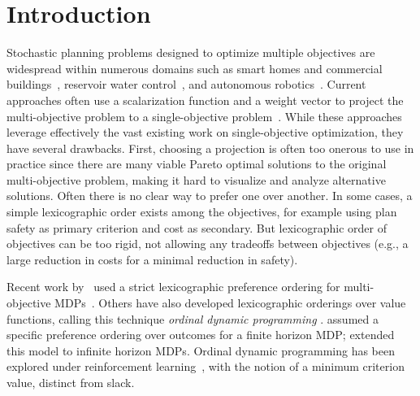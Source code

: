 \section{Introduction}
\label{sec:introduction}

Stochastic planning problems designed to optimize multiple objectives are widespread within numerous domains such as smart homes and commercial buildings~\cite{Kwak12-SAVES}, reservoir water control~\cite{Castelletti08-WaterReservoirControl}, and autonomous robotics~\cite{Mouaddib04-MultiObjectivePathPlanning,Calisi07-MultiObjectiveExplorationAndSearchRobots}. 
Current approaches often use a scalarization function and a weight vector to project the multi-objective problem to a single-objective problem~\cite{Roijers13-SurveyMultiObjective,Natarajan05-DynamicPreferencesMCRL,Perny10-FindingCompromiseSolutionsMOMDPs,Perny13-LorenzOptimalSolutionsMOMDPs}. While these approaches leverage effectively the vast existing work on single-objective optimization, they have several drawbacks.  First, choosing a projection is often too onerous to use in practice since there are many viable Pareto optimal solutions to the original multi-objective problem, making it hard to visualize and analyze alternative solutions. Often there is no clear way to prefer one over another. In some cases, a simple lexicographic order exists among the objectives, for example using plan safety as primary criterion and cost as secondary. But lexicographic order of objectives can be too rigid, not allowing any tradeoffs between objectives (e.g., a large reduction in costs for a minimal reduction in safety).

Recent work by~\citeauthor{Mouaddib04-MultiObjectivePathPlanning} used a strict lexicographic preference ordering for multi-objective MDPs~\cite{Mouaddib04-MultiObjectivePathPlanning}. Others have also developed lexicographic orderings over value functions, calling this technique \emph{ordinal dynamic programming} \cite{Mitten74-PreferenceOrderDynamicProgramming,Sobel75-OrdinalDynamicProgramming}. \citeauthor{Mitten74-PreferenceOrderDynamicProgramming} assumed a specific preference ordering over outcomes for a finite horizon MDP; \citeauthor{Sobel75-OrdinalDynamicProgramming} extended this model to infinite horizon MDPs. Ordinal dynamic programming has been explored under reinforcement learning~\cite{Gabor98-MultiObjectiveReinforcementLearning,Natarajan05-DynamicPreferencesMCRL}, with the notion of a minimum criterion value, distinct from slack. 

